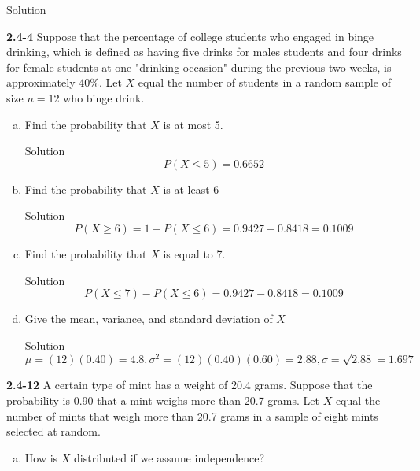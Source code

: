 \documentclass{article}
\begin{document}
\begin{spacing}{1.1}
\begin{homeworkProblem}
\begin{enumerate}[(a)]
\begin{homeworkSection}{Solution}
			\end{homeworkSection}
	\end{enumerate}
\end{homeworkProblem}
\begin{homeworkProblem}
	{\bf  2.4-4}	 Suppose that the percentage of college students who engaged in binge drinking, which is defined as having five drinks for males students and four drinks for female students at one "drinking occasion" during the previous two weeks, is approximately 40\%.  Let $X$ equal the number of students in a random sample of size $n = 12$ who binge drink.  
	\begin{enumerate}[(a)]
		\item Find the probability that $X$ is at most 5.
			\begin{homeworkSection}{Solution}
				\[ P(X \le 5) = 0.6652\]
			\end{homeworkSection}
		\item Find the probability that $X$ is at least 6
			\begin{homeworkSection}{Solution}
				\[P(X \ge 6) = 1 - P(X \le 6) = 0.9427 - 0.8418 = 0.1009 \]
			\end{homeworkSection}
		\item Find the probability that $X$ is equal to 7.
			\begin{homeworkSection}{Solution}
				\[P(X \le 7) - P(X \le 6) = 0.9427 - 0.8418 = 0.1009\]
			\end{homeworkSection}
		\item Give the mean, variance, and standard deviation of $X$
			\begin{homeworkSection}{Solution}
				\[ \mu = (12)(0.40) = 4.8, \sigma^2 = (12)(0.40)(0.60) = 2.88, \sigma = \sqrt {2.88} = 1.697 \]
			\end{homeworkSection}
	\end{enumerate}
\end{homeworkProblem}
\begin{homeworkProblem}
	{\bf 2.4-12} A certain type of mint has a weight of 20.4 grams.  Suppose that the probability is 0.90 that a mint weighs more than 20.7 grams.  Let $X$ equal the number of mints that weigh more than 20.7 grams in a sample of eight mints selected at random.
	\begin{enumerate}[(a)]
		\item How is $X$ distributed if we assume independence?

\end{enumerate}
\end{homeworkProblem}
\end{spacing}
\end{document}
